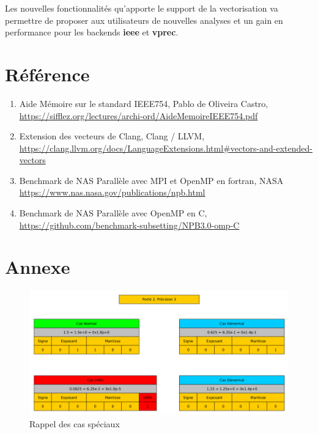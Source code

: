 \documentclass[11pt, letterpaper]{article}
\begin{document}
Les nouvelles fonctionnalités qu'apporte le support de la vectorisation va
permettre de proposer aux utilisateurs de nouvelles analyses et un gain en
performance pour les backends \textbf{ieee} et \textbf{vprec}.

\section{Référence}
\label{sec:org6f5f3da}

\begin{enumerate}
\item \label{orgbf38357} Aide Mémoire sur le standard IEEE754, Pablo de Oliveira Castro,
\url{https://sifflez.org/lectures/archi-ord/AideMemoireIEEE754.pdf}
\item \label{org5643b17} Extension des vecteurs de Clang, Clang / LLVM,
\url{https://clang.llvm.org/docs/LanguageExtensions.html\#vectors-and-extended-vectors}
\item Benchmark de NAS Parallèle avec MPI et OpenMP en fortran, NASA
\url{https://www.nas.nasa.gov/publications/npb.html}
\item Benchmark de NAS Parallèle avec OpenMP en C,
\url{https://github.com/benchmark-subsetting/NPB3.0-omp-C}
\end{enumerate}

\section{Annexe}
\label{sec:org57756fb}

\label{org75c47eb}
\begin{figure}[htbp]
\centering
\includegraphics[width=450px]{../ressources/special_case.png}
\caption{\label{fig:org0a9af5e}Rappel des cas spéciaux}
\end{figure}
\end{document}
